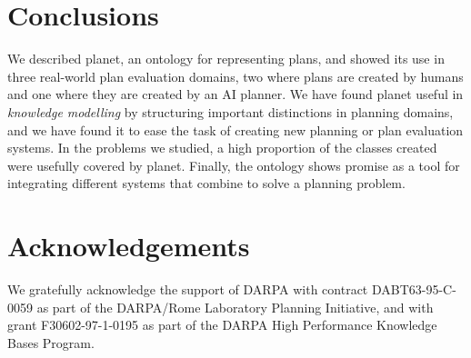 \section{Conclusions}

We described {\sc planet}, an ontology for representing plans, and
showed its use in three real-world plan evaluation domains, two where
plans are created by humans and one where they are created by an AI
planner. We have found {\sc planet} useful in {\em knowledge modelling}
by structuring important distinctions in planning domains, and we have
found it to ease the task of creating new planning or plan evaluation
systems. In the problems we studied, a high proportion of the classes
created were usefully covered by {\sc planet}. Finally, the ontology
shows promise as a tool for integrating different systems that combine
to solve a planning problem.

\section*{Acknowledgements}

We gratefully acknowledge the support of DARPA with
contract DABT63-95-C-0059 as part of the DARPA/Rome
Laboratory Planning Initiative,
and with
grant F30602-97-1-0195 as part of the DARPA
High Performance Knowledge Bases Program.

